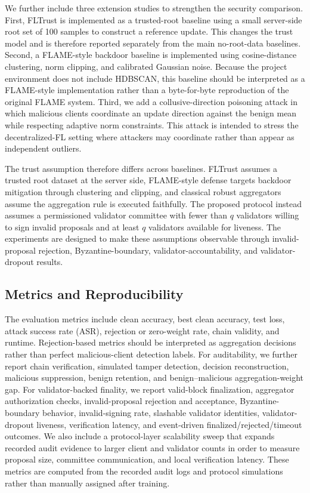\documentclass[preprint,12pt]{elsarticle}
\begin{document}
We further include three extension studies to strengthen the security comparison. First, FLTrust is implemented as a trusted-root baseline using a small server-side root set of 100 samples to construct a reference update. This changes the trust model and is therefore reported separately from the main no-root-data baselines. Second, a FLAME-style backdoor baseline is implemented using cosine-distance clustering, norm clipping, and calibrated Gaussian noise. Because the project environment does not include HDBSCAN, this baseline should be interpreted as a FLAME-style implementation rather than a byte-for-byte reproduction of the original FLAME system. Third, we add a collusive-direction poisoning attack in which malicious clients coordinate an update direction against the benign mean while respecting adaptive norm constraints. This attack is intended to stress the decentralized-FL setting where attackers may coordinate rather than appear as independent outliers.

The trust assumption therefore differs across baselines. FLTrust assumes a trusted root dataset at the server side, FLAME-style defense targets backdoor mitigation through clustering and clipping, and classical robust aggregators assume the aggregation rule is executed faithfully. The proposed protocol instead assumes a permissioned validator committee with fewer than $q$ validators willing to sign invalid proposals and at least $q$ validators available for liveness. The experiments are designed to make these assumptions observable through invalid-proposal rejection, Byzantine-boundary, validator-accountability, and validator-dropout results.

\subsection{Metrics and Reproducibility}

The evaluation metrics include clean accuracy, best clean accuracy, test loss, attack success rate (ASR), rejection or zero-weight rate, chain validity, and runtime. Rejection-based metrics should be interpreted as aggregation decisions rather than perfect malicious-client detection labels. For auditability, we further report chain verification, simulated tamper detection, decision reconstruction, malicious suppression, benign retention, and benign--malicious aggregation-weight gap. For validator-backed finality, we report valid-block finalization, aggregator authorization checks, invalid-proposal rejection and acceptance, Byzantine-boundary behavior, invalid-signing rate, slashable validator identities, validator-dropout liveness, verification latency, and event-driven finalized/rejected/timeout outcomes. We also include a protocol-layer scalability sweep that expands recorded audit evidence to larger client and validator counts in order to measure proposal size, committee communication, and local verification latency. These metrics are computed from the recorded audit logs and protocol simulations rather than manually assigned after training.
\end{document}
